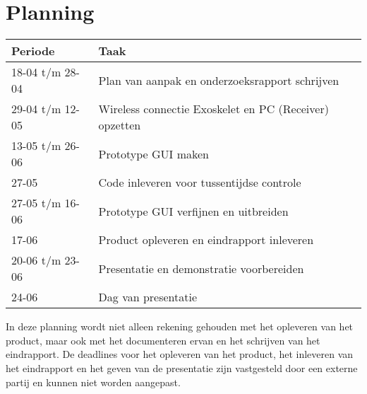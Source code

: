 \section{Planning}
{\renewcommand{\arraystretch}{1.5}
\centering
\begin{tabular}{ | l | l | }
	\hline
	\bfseries{Periode} & \bfseries{Taak} \\ \hline
	18-04 t/m 28-04 & Plan van aanpak en onderzoeksrapport schrijven\\ \hline
	29-04 t/m 12-05 & Wireless connectie Exoskelet en PC (Receiver) opzetten   \\ \hline
	13-05 t/m 26-06 & Prototype GUI maken \\ \hline
	27-05 & Code inleveren voor tussentijdse controle \\ \hline 
	27-05 t/m 16-06 & Prototype GUI verfijnen en uitbreiden \\ \hline
	17-06 & Product opleveren en eindrapport inleveren \\ \hline
	20-06 t/m 23-06 & Presentatie en demonstratie voorbereiden \\ \hline
	24-06 & Dag van presentatie \\ \hline
\end{tabular}
}

In deze planning wordt niet alleen rekening gehouden met het opleveren van het product, maar ook met het documenteren ervan en het schrijven van het eindrapport. De deadlines voor het opleveren van het product, het inleveren van het eindrapport en het geven van de presentatie zijn vastgesteld door een externe partij en kunnen niet worden aangepast.


